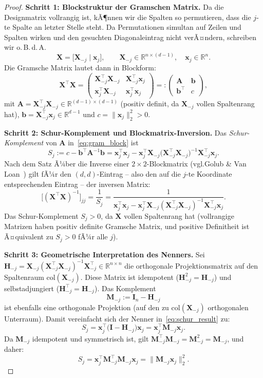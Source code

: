 ﻿\documentclass[12pt, a4paper]{article}
\theoremstyle{definition}
\theoremstyle{remark}
\newcommand{\R}{\mathbb{R}}
\newcommand{\vx}{\bm{x}}
\newcommand{\vX}{\bm{X}}
\newcommand{\T}{\top}
\begin{document}
\begin{proof}
	\textbf{Schritt 1: Blockstruktur der Gramschen Matrix.}
	Da die Designmatrix vollrangig ist, kÃ¶nnen wir die Spalten so permutieren, dass die
	$j$-te Spalte an letzter Stelle steht. Da Permutationen simultan auf Zeilen und Spalten
	wirken und den gesuchten Diagonaleintrag nicht verÃ¤ndern, schreiben wir o.\,B.\,d.\,A.
	\[
	\vX = \bigl[\vX_{-j} \;\big|\; \vx_j\bigr], \qquad \vX_{-j} \in \R^{n \times (d-1)},\quad \vx_j \in \R^n.
	\]
	Die Gramsche Matrix lautet dann in Blockform:
	\begin{equation}
		\vX^\T\vX
		= \begin{pmatrix} \vX_{-j}^\T\vX_{-j} & \vX_{-j}^\T\vx_j \\[4pt]
			\vx_j^\T\vX_{-j} & \vx_j^\T\vx_j \end{pmatrix}
		=: \begin{pmatrix} \bm{A} & \bm{b} \\ \bm{b}^\T & c \end{pmatrix},
		\label{eq:gram_block}
	\end{equation}
	mit $\bm{A} = \vX_{-j}^\T\vX_{-j} \in \R^{(d-1)\times(d-1)}$ (positiv definit, da $\vX_{-j}$
	vollen Spaltenrang hat), $\bm{b} = \vX_{-j}^\T\vx_j \in \R^{d-1}$ und
	$c = \|\vx_j\|_2^2 > 0$.

	\textbf{Schritt 2: Schur-Komplement und Blockmatrix-Inversion.}
	Das \emph{Schur-Komplement} von $\bm{A}$ in~\eqref{eq:gram_block} ist
	\[
	S_j := c - \bm{b}^\T\bm{A}^{-1}\bm{b}
	= \vx_j^\T\vx_j - \vx_j^\T\vX_{-j}\bigl(\vX_{-j}^\T\vX_{-j}\bigr)^{-1}\vX_{-j}^\T\vx_j.
	\]
	Nach dem Satz Ã¼ber die Inverse einer $2\times2$-Blockmatrix (vgl.\@ Golub \& Van
	Loan~\cite{golub2013matrix}) gilt fÃ¼r den $(d,d)$-Eintrag -- also den auf die $j$-te
	Koordinate entsprechenden Eintrag -- der inversen Matrix:
	\begin{equation}
		\bigl[(\vX^\T\vX)^{-1}\bigr]_{jj} = \frac{1}{S_j}
		= \frac{1}{\vx_j^\T\vx_j - \vx_j^\T\vX_{-j}(\vX_{-j}^\T\vX_{-j})^{-1}\vX_{-j}^\T\vx_j}.
		\label{eq:schur_result}
	\end{equation}
	Das Schur-Komplement $S_j > 0$, da $\vX$ vollen Spaltenrang hat (vollrangige Matrizen
	haben positiv definite Gramsche Matrix, und positive Definitheit ist Ã¤quivalent zu
	$S_j > 0$ fÃ¼r alle $j$).

	\textbf{Schritt 3: Geometrische Interpretation des Nenners.}
	Sei $\bm{H}_{-j} = \vX_{-j}(\vX_{-j}^\T\vX_{-j})^{-1}\vX_{-j}^\T \in \R^{n\times n}$ die
	orthogonale Projektionsmatrix auf den Spaltenraum $\mathrm{col}(\vX_{-j})$. Diese Matrix
	ist idempotent ($\bm{H}_{-j}^2 = \bm{H}_{-j}$) und selbstadjungiert ($\bm{H}_{-j}^\T = \bm{H}_{-j}$).
	Das Komplement
	\[
	\bm{M}_{-j} := \bm{I}_n - \bm{H}_{-j}
	\]
	ist ebenfalls eine orthogonale Projektion (auf den zu $\mathrm{col}(\vX_{-j})$ orthogonalen
	Unterraum). Damit vereinfacht sich der Nenner in~\eqref{eq:schur_result} zu:
	\[
	S_j = \vx_j^\T\bigl(\bm{I} - \bm{H}_{-j}\bigr)\vx_j = \vx_j^\T\bm{M}_{-j}\vx_j.
	\]
	Da $\bm{M}_{-j}$ idempotent und symmetrisch ist, gilt $\bm{M}_{-j}^\T\bm{M}_{-j} = \bm{M}_{-j}^2 = \bm{M}_{-j}$,
	und daher:
	\[
	S_j = \vx_j^\T\bm{M}_{-j}^\T\bm{M}_{-j}\vx_j = \|\bm{M}_{-j}\vx_j\|_2^2.
	\]


\end{proof}
\end{document}
